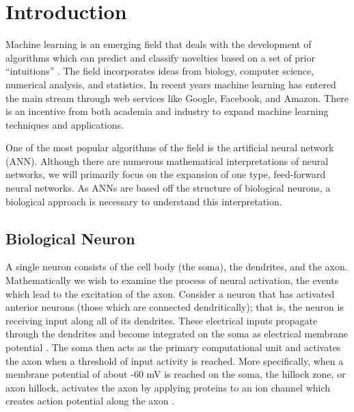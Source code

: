 \section{Introduction }
Machine learning is an emerging field that deals with the development of algorithms which can predict and classify novelties based on a set of prior “intuitions” \cite{mlsurvey}. The field incorporates ideas from biology, computer science, numerical analysis, and statistics. In recent years machine learning has entered the main stream through web services like Google, Facebook, and Amazon. There is an incentive from both academia and industry to expand machine learning techniques and applications. 

One of the most popular algorithms of the field is the artificial neural network (ANN). Although there are numerous mathematical interpretations of neural networks, we will primarily focus on the expansion of one type, feed-forward neural networks. As ANNs are based off the structure of biological neurons, a biological approach is necessary to understand this interpretation.
\subsection{Biological Neuron}
A single neuron consists of the cell body (the soma), the dendrites, and the axon. Mathematically we wish to examine the process of neural activation, the events which lead to the excitation of the axon. Consider a neuron that has activated anterior neurons (those which are connected dendritically); that is, the neuron is receiving input along all of its dendrites. These electrical inputs propagate through the dendrites and become integrated on the soma as electrical membrane potential \cite{griffith}. The soma then acts as the primary computational unit and activates the axon when a threshold of input activity is reached. More specifically, when a membrane potential of about -60 mV is reached on the soma, the hillock zone, or axon hillock, activates the axon by applying proteins to an ion channel which creates action potential along the axon \cite{bioneuron}.
